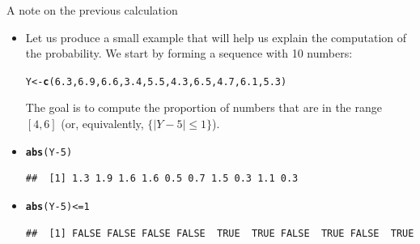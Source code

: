 \documentclass[10pt,handout]{beamer}\usepackage[]{graphicx}\usepackage[]{color}
\makeatletter
\newcommand{\hlnum}[1]{\textcolor[rgb]{0.686,0.059,0.569}{#1}}%
\newcommand{\hlopt}[1]{\textcolor[rgb]{0,0,0}{#1}}%
\newcommand{\hlstd}[1]{\textcolor[rgb]{0.345,0.345,0.345}{#1}}%
\newcommand{\hlkwb}[1]{\textcolor[rgb]{0.69,0.353,0.396}{#1}}%
\newcommand{\hlkwd}[1]{\textcolor[rgb]{0.737,0.353,0.396}{\textbf{#1}}}%
\newenvironment{kframe}{%
 \def\at@end@of@kframe{}%
 \ifinner\ifhmode%
  \def\at@end@of@kframe{\end{minipage}}%
  \begin{minipage}{\columnwidth}%
 \fi\fi%
 \def\FrameCommand##1{\hskip\@totalleftmargin \hskip-\fboxsep
 \colorbox{shadecolor}{##1}\hskip-\fboxsep
     \hskip-\linewidth \hskip-\@totalleftmargin \hskip\columnwidth}%
 \MakeFramed {\advance\hsize-\width
   \@totalleftmargin\z@ \linewidth\hsize
   \@setminipage}}%
 {\par\unskip\endMakeFramed%
 \at@end@of@kframe}
\newenvironment{knitrout}{}{} %
\makeatother
\begin{document}
\begin{frame}[fragile]{A note on the previous calculation}
	\small
	\begin{itemize}[<+->]
		
		\item Let us produce a small example that will help us explain the computation
		of the probability. We start by forming a sequence with 10 numbers:
				
\begin{knitrout}
\color{fgcolor}\begin{kframe}
\begin{alltt}
\hlstd{Y} \hlkwb{<-} \hlkwd{c}\hlstd{(}\hlnum{6.3}\hlstd{,} \hlnum{6.9}\hlstd{,} \hlnum{6.6}\hlstd{,} \hlnum{3.4}\hlstd{,} \hlnum{5.5}\hlstd{,} \hlnum{4.3}\hlstd{,} \hlnum{6.5}\hlstd{,} \hlnum{4.7}\hlstd{,} \hlnum{6.1}\hlstd{,} \hlnum{5.3}\hlstd{)}
\end{alltt}
\end{kframe}
\end{knitrout}
		
		The goal is to compute the proportion of numbers that are in the range
		$[4,6]$ (or, equivalently, $\{|Y-5| \leq 1\}$).
		
		\item 
		
\begin{knitrout}
\color{fgcolor}\begin{kframe}
\begin{alltt}
\hlkwd{abs}\hlstd{(Y}\hlopt{-}\hlnum{5}\hlstd{)}
\end{alltt}
\begin{verbatim}
##  [1] 1.3 1.9 1.6 1.6 0.5 0.7 1.5 0.3 1.1 0.3
\end{verbatim}
\end{kframe}
\end{knitrout}

\item 

\begin{knitrout}
\color{fgcolor}\begin{kframe}
\begin{alltt}
\hlkwd{abs}\hlstd{(Y} \hlopt{-} \hlnum{5}\hlstd{)} \hlopt{<=} \hlnum{1}
\end{alltt}
\begin{verbatim}
##  [1] FALSE FALSE FALSE FALSE  TRUE  TRUE FALSE  TRUE FALSE  TRUE
\end{verbatim}
\end{kframe}
\end{knitrout}



\end{itemize}
\end{frame}
\end{document}
